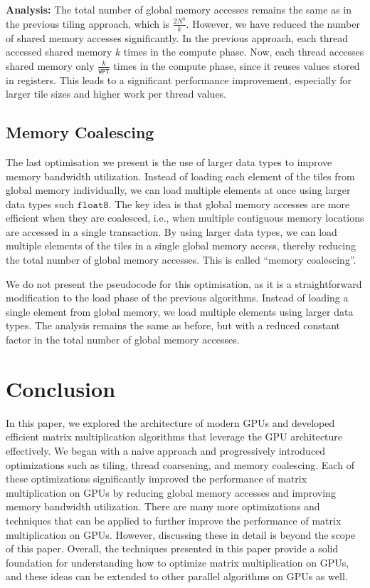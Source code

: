 \documentclass{article}
\begin{document}
\textbf{Analysis:} The total number of global memory accesses remains the same as in the previous tiling approach, which is $\frac{2N^3}{k}$. However, we have reduced the number of shared memory accesses significantly. In the previous approach, each thread accessed shared memory $k$ times in the compute phase. Now, each thread accesses shared memory only $\frac{k}{\texttt{WPT}}$ times in the compute phase, since it reuses values stored in registers. This leads to a significant performance improvement, especially for larger tile sizes and higher work per thread values.

\vspace{0.2in}
\subsection{Memory Coalescing}
The last optimisation we present is the use of larger data types to improve memory bandwidth utilization. Instead of loading each element of the tiles from global memory individually, we can load multiple elements at once using larger data types such $\texttt{float8}$. The key idea is that global memory accesses are more efficient when they are coalesced, i.e., when multiple contiguous memory locations are accessed in a single transaction. By using larger data types, we can load multiple elements of the tiles in a single global memory access, thereby reducing the total number of global memory accesses. This is called ``memory coalescing''.

We do not present the pseudocode for this optimisation, as it is a straightforward modification to the load phase of the previous algorithms. Instead of loading a single element from global memory, we load multiple elements using larger data types. The analysis remains the same as before, but with a reduced constant factor in the total number of global memory accesses.

\vspace{0.5in}
\section{Conclusion}
In this paper, we explored the architecture of modern GPUs and developed efficient matrix multiplication algorithms that leverage the GPU architecture effectively. We began with a naive approach and progressively introduced optimizations such as tiling, thread coarsening, and memory coalescing. Each of these optimizations significantly improved the performance of matrix multiplication on GPUs by reducing global memory accesses and improving memory bandwidth utilization. There are many more optimizations and techniques that can be applied to further improve the performance of matrix multiplication on GPUs. However, discussing these in detail is beyond the scope of this paper. Overall, the techniques presented in this paper provide a solid foundation for understanding how to optimize matrix multiplication on GPUs, and these ideas can be extended to other parallel algorithms on GPUs as well.
\end{document}
